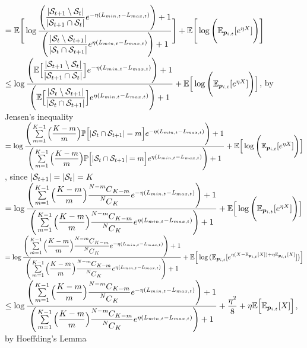 \documentclass{article}
\newcommand\Mycomb[2][^n]{\prescript{#1\mkern-0.5mu}{}C_{#2}}
\theoremstyle{definition}
\begin{document}
    $=\mathbb{E}\Bigg[\log{{\dfrac{\Bigg(\dfrac{\abs{\mathcal{S}_{t+1}\setminus\mathcal{S}_{t}}}{\abs{\mathcal{S}_{t+1}\cap\mathcal{S}_{t}}}e^{-\eta(L_{min,t}-L_{max,t})}\Bigg)+1}{\Bigg(\dfrac{\abs{\mathcal{S}_{t}\setminus\mathcal{S}_{t+1}}}{\abs{\mathcal{S}_{t}\cap\mathcal{S}_{t+1}}}e^{\eta(L_{min,t}-L_{max,t})}\Bigg)+1}}}\Bigg]+\mathbb{E}\Bigg[\log{\Bigg(\mathbb{E}_{\bm{p}_{i,t}}[e^{\eta X}]}\Bigg)\Bigg]$\\
    $\leq\log{{\dfrac{\Bigg(\mathbb{E}\Big[\dfrac{\abs{\mathcal{S}_{t+1}\setminus\mathcal{S}_{t}}}{\abs{\mathcal{S}_{t+1}\cap\mathcal{S}_{t}}}\Big]e^{-\eta(L_{min,t}-L_{max,t})}\Bigg)+1}{\Bigg(\mathbb{E}\Big[\dfrac{\abs{\mathcal{S}_{t}\setminus\mathcal{S}_{t+1}}}{\abs{\mathcal{S}_{t}\cap\mathcal{S}_{t+1}}}\Big]e^{\eta(L_{min,t}-L_{max,t})}\Bigg)+1}}}+\mathbb{E}\Big[\log{\Bigg(\mathbb{E}_{\bm{p}_{i,t}}[e^{\eta X}]}\Bigg)\Big]$, by Jensen's inequality\\
    $=\log{{\dfrac{\Bigg(\sum\limits_{m=1}^{K-1}\Big(\dfrac{K-m}{m}\Big)\mathbb{P}\Big[\abs{\mathcal{S}_{t}\cap\mathcal{S}_{t+1}}=m\Big]e^{-\eta(L_{min,t}-L_{max,t})}\Bigg)+1}{\Bigg(\sum\limits_{m=1}^{K-1}\Big(\dfrac{K-m}{m}\Big)\mathbb{P}\Big[\abs{\mathcal{S}_{t}\cap\mathcal{S}_{t+1}}=m\Big]e^{\eta(L_{min,t}-L_{max,t})}\Bigg)+1}}}+\mathbb{E}\Big[\log{\Bigg(\mathbb{E}_{\bm{p}_{i,t}}[e^{\eta X}]}\Bigg)\Big]$, since $\abs{\mathcal{S}_{t+1}}=\abs{\mathcal{S}_{t}}=K$\\
    $=\log{{\dfrac{\Bigg(\sum\limits_{m=1}^{K-1}\Big(\dfrac{K-m}{m}\Big){\dfrac{\Mycomb[N-m]{K-m}}{\Mycomb[N]{K}}}e^{-\eta(L_{min,t}-L_{max,t})}\Bigg)+1}{\Bigg(\sum\limits_{m=1}^{K-1}\Big(\dfrac{K-m}{m}\Big){\dfrac{\Mycomb[N-m]{K-m}}{\Mycomb[N]{K}}}e^{\eta(L_{min,t}-L_{max,t})}\Bigg)+1}}}+\mathbb{E}\Big[\log{\Bigg(\mathbb{E}_{\bm{p}_{i,t}}[e^{\eta X}]}\Bigg)\Big]$\\
    $=\log{{\dfrac{\Bigg(\sum\limits_{m=1}^{K-1}\Big(\dfrac{K-m}{m}\Big){\dfrac{\Mycomb[N-m]{K-m}}{\Mycomb[N]{K}}}e^{-\eta(L_{min,t}-L_{max,t})}\Bigg)+1}{\Bigg(\sum\limits_{m=1}^{K-1}\Big(\dfrac{K-m}{m}\Big){\dfrac{\Mycomb[N-m]{K-m}}{\Mycomb[N]{K}}}e^{\eta(L_{min,t}-L_{max,t})}\Bigg)+1}}}+\mathbb{E}\Big[\log{(\mathbb{E}_{\bm{p}_{i,t}}[e^{\eta(X-\mathbb{E}_{\bm{p}_{i,t}}[X])+\eta\mathbb{E}_{\bm{p}_{i,t}}[X]}])}\Big]$\\
    $\leq\log{{\dfrac{\Bigg(\sum\limits_{m=1}^{K-1}\Big(\dfrac{K-m}{m}\Big){\dfrac{\Mycomb[N-m]{K-m}}{\Mycomb[N]{K}}}e^{-\eta(L_{min,t}-L_{max,t})}\Bigg)+1}{\Bigg(\sum\limits_{m=1}^{K-1}\Big(\dfrac{K-m}{m}\Big){\dfrac{\Mycomb[N-m]{K-m}}{\Mycomb[N]{K}}}e^{\eta(L_{min,t}-L_{max,t})}\Bigg)+1}}}+\dfrac{\eta^{2}}{8}+\eta\mathbb{E}\Big[\mathbb{E}_{\bm{p}_{i,t}}[X]\Big]$, by Hoeffding's Lemma\\
\end{document}
